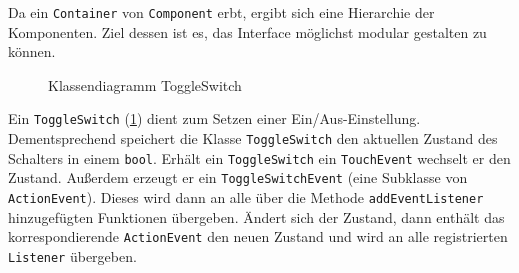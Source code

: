 		Da ein \texttt{Container} von \texttt{Component} erbt, ergibt sich eine Hierarchie der Komponenten. Ziel dessen ist es, das Interface möglichst modular gestalten zu können.
		
		\medskip
		\begin{figure}
			\caption{Klassendiagramm ToggleSwitch}
			\label{uml-toggleswitch}
		\end{figure}
		Ein \texttt{ToggleSwitch} (\ref{uml-toggleswitch}) dient zum Setzen einer Ein/Aus-Einstellung.
		Dementsprechend speichert die Klasse \texttt{ToggleSwitch} den aktuellen Zustand des Schalters in einem \texttt{bool}.
		Erhält ein \texttt{ToggleSwitch} ein \texttt{TouchEvent} wechselt er den Zustand.
		Außerdem erzeugt er ein \texttt{ToggleSwitchEvent} (eine Subklasse von \texttt{ActionEvent}).
		Dieses wird dann an alle über die Methode \texttt{addEventListener} hinzugefügten Funktionen übergeben.
		Ändert sich der Zustand, dann enthält das korrespondierende \texttt{ActionEvent} den neuen Zustand und wird an alle registrierten \texttt{Listener} übergeben.
		

